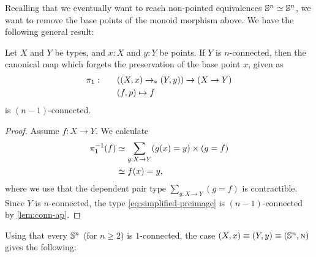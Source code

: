 \documentclass[english,a4paper]{lmcs}
\begin{document}
Recalling that we eventually want to reach non-pointed equivalences ${\mathbb S^{n}} \simeq {\mathbb S^{n}}$,
we want to remove the base points of the monoid morphism above.
We have the following general result:


\begin{lem} \label{lem:forget-points-conn}
    Let $X$ and $Y$ be types, and $x : X$ and $y : Y$ be points. If $Y$ is $n$-connected, then the canonical map which forgets the preservation of the base point $x$, given as
    \begin{alignat}{2}
    \pi_1: && \quad & ((X,x) \to_\ast (Y,y)) \to (X \to Y) \\
    &&& (f,p) \mapsto f
    \end{alignat}
    is $(n-1)$-connected.
\end{lem}
\begin{proof}
    Assume $f : X \to Y$.
    We calculate
    \begin{align}
      \pi_1^{-1}(f)
      &\simeq \sum_{g : X \to Y}(g(x) = y) \times (g = f) \\
      &\simeq f(x) = y, \label{eq:simplified-preimage}
    \end{align}
    where we use that the dependent pair type $\sum_{g : X \to Y} (g = f)$ is contractible.
    Since $Y$ is $n$-connected, the type \eqref{eq:simplified-preimage} is $(n-1)$-connected by \cref{lem:conn-ap}.
%
\end{proof}

Using that every ${\mathbb S^{n}}$ (for $n \geq 2$) is $1$-connected, the case $(X,x) \equiv (Y,y) \equiv ({\mathbb S^{n}}, \textsc{n})$ gives the following:
%
\end{document}
